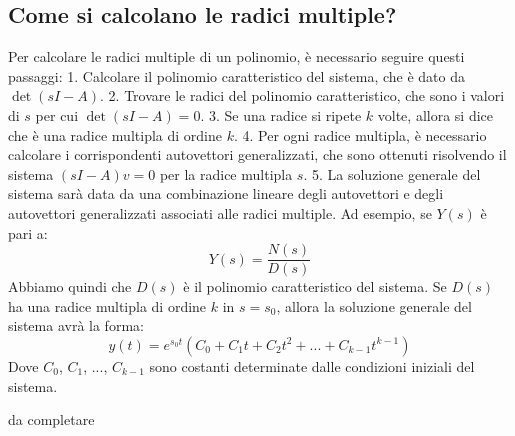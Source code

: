 \subsection{Come si calcolano le radici multiple?}
Per calcolare le radici multiple di un polinomio, è necessario seguire questi
passaggi: 1. Calcolare il polinomio caratteristico del sistema, che è dato da
$\det(sI - A)$. 2. Trovare le radici del polinomio caratteristico, che sono i
valori di $s$ per cui $\det(sI - A) = 0$. 3. Se una radice si ripete $k$ volte,
allora si dice che è una radice multipla di ordine $k$. 4. Per ogni radice
multipla, è necessario calcolare i corrispondenti autovettori generalizzati,
che sono ottenuti risolvendo il sistema $(sI - A) v = 0$ per la radice multipla
$s$. 5. La soluzione generale del sistema sarà data da una combinazione lineare
degli autovettori e degli autovettori generalizzati associati alle radici
multiple. Ad esempio, se $Y(s)$ è pari a:
\begin{equation}
    Y(s) = \frac{N(s)}{D(s)}
\end{equation}
Abbiamo quindi che $D(s)$ è il polinomio caratteristico del sistema. Se $D(s)$
ha una radice multipla di ordine $k$ in $s = s_0$, allora la soluzione generale
del sistema avrà la forma:
\begin{equation}
    y(t) = e^{s_0 t} (C_0 + C_1 t + C_2 t^2 + ... + C_{k-1} t^{k-1})
\end{equation}
Dove $C_0$, $C_1$, ..., $C_{k-1}$ sono costanti determinate dalle condizioni
iniziali del sistema.

da completare

